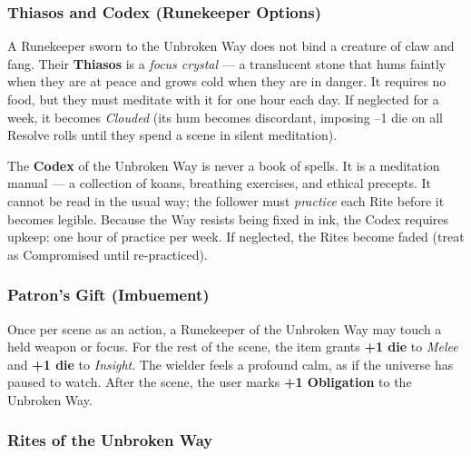 \subsubsection*{Thiasos and Codex (Runekeeper Options)}

A Runekeeper sworn to the Unbroken Way does not bind a creature of claw and fang. Their \textbf{Thiasos} is a \textit{focus crystal} --- a translucent stone that hums faintly when they are at peace and grows cold when they are in danger. It requires no food, but they must meditate with it for one hour each day. If neglected for a week, it becomes \textit{Clouded} (its hum becomes discordant, imposing --1 die on all Resolve rolls until they spend a scene in silent meditation).

The \textbf{Codex} of the Unbroken Way is never a book of spells. It is a meditation manual --- a collection of koans, breathing exercises, and ethical precepts. It cannot be read in the usual way; the follower must \textit{practice} each Rite before it becomes legible. Because the Way resists being fixed in ink, the Codex requires upkeep: one hour of practice per week. If neglected, the Rites become faded (treat as Compromised until re-practiced).

\subsubsection*{Patron's Gift (Imbuement)}

Once per scene as an action, a Runekeeper of the Unbroken Way may touch a held weapon or focus. For the rest of the scene, the item grants \textbf{+1 die} to \textit{Melee} and \textbf{+1 die} to \textit{Insight}. The wielder feels a profound calm, as if the universe has paused to watch. After the scene, the user marks \textbf{+1 Obligation} to the Unbroken Way.

\subsubsection*{Rites of the Unbroken Way}


